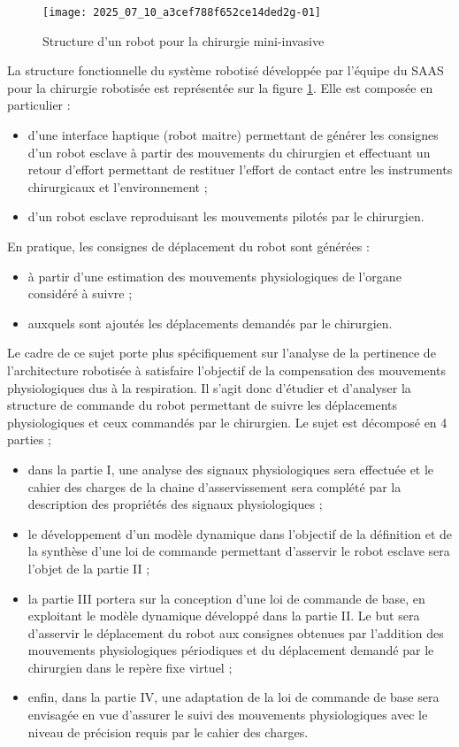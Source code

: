 \begin{figure}[!h]
\texttt{[image: 2025\_07\_10\_a3cef788f652ce14ded2g-01]}
\centering
\caption{Structure d'un robot pour la chirurgie mini-invasive\label{ccs_psi_2019_fig_01}}
\end{figure}

La structure fonctionnelle du système robotisé développée par l'équipe du SAAS pour la chirurgie robotisée est représentée sur la figure \ref{ccs_psi_2019_fig_01}. Elle est composée en particulier :

\begin{itemize}
  \item d'une interface haptique (robot maitre) permettant de générer les consignes d'un robot esclave à partir des mouvements du chirurgien et effectuant un retour d'effort permettant de restituer l'effort de contact entre les instruments chirurgicaux et l'environnement ;
  \item d'un robot esclave reproduisant les mouvements pilotés par le chirurgien.
\end{itemize}


En pratique, les consignes de déplacement du robot sont générées :
\begin{itemize}
  \item à partir d'une estimation des mouvements physiologiques de l'organe considéré à suivre ;
  \item auxquels sont ajoutés les déplacements demandés par le chirurgien.
\end{itemize}

Le cadre de ce sujet porte plus spécifiquement sur l'analyse de la pertinence de l'architecture robotisée à satisfaire l'objectif de la compensation des mouvements physiologiques dus à la respiration. Il s'agit donc d'étudier et d'analyser la structure de commande du robot permettant de suivre les déplacements physiologiques et ceux commandés par le chirurgien. Le sujet est décomposé en 4 parties ;

\begin{itemize}
  \item dans la partie I, une analyse des signaux physiologiques sera effectuée et le cahier des charges de la chaine d'asservissement sera complété par la description des propriétés des signaux physiologiques ;
  \item le développement d'un modèle dynamique dans l'objectif de la définition et de la synthèse d'une loi de commande permettant d'asservir le robot esclave sera l'objet de la partie II ;
  \item la partie III portera sur la conception d'une loi de commande de base, en exploitant le modèle dynamique développé dans la partie II. Le but sera d'asservir le déplacement du robot aux consignes obtenues par l'addition des mouvements physiologiques périodiques et du déplacement demandé par le chirurgien dans le repère fixe virtuel ;
  \item enfin, dans la partie IV, une adaptation de la loi de commande de base sera envisagée en vue d'assurer le suivi des mouvements physiologiques avec le niveau de précision requis par le cahier des charges.
\end{itemize}

